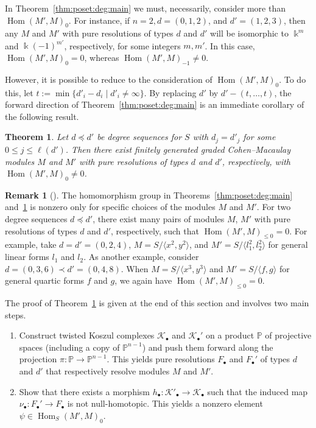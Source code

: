 \documentclass[12pt]{amsart}
\newtheorem{thm}[equation]{Theorem}
\theoremstyle{definition}
\newtheorem{rmk}[equation]{Remark}
\newenvironment{remark}[1][]{\begin{rmk}[#1] \pushQED{\qed}}{\popQED \end{rmk}}
\def\<{\langle}
\def\>{\rangle}
\newcommand{\Hom}{\operatorname{Hom}}
\newcommand{\KK}{\mathcal{K}}
\newcommand{\PP}{\mathbb{P}}
\begin{document}
In Theorem~\ref{thm:poset:deg:main} we must, necessarily, consider more
than $\Hom(M',M)_0$. 
For instance, if $n=2, d=(0,1,2)$, and $d'=(1,2,3)$, then any $M$ and
$M'$ with pure resolutions of types $d$ and $d'$ will be isomorphic to
$\Bbbk^m$ and $\Bbbk(-1)^{m'}$, respectively, for some integers $m,m'$.  
In this case, $\Hom(M',M)_0=0$, whereas $\Hom(M',M)_{-1}\ne 0$.

However, it is possible to reduce to the consideration of $\Hom(M',M)_0$.
To do this, let $t := \min \{d'_i - d_i \mid d'_i\neq \infty \}$. 
By replacing $d'$ by $d' - (t,\dots,t)$, 
the forward direction of Theorem~\ref{thm:poset:deg:main} 
is an immediate corollary of the following result. 

\begin{thm}
\label{thm:deg:after:reduction}
Let $d \preceq d'$ be degree sequences for $S$ with 
$d_j = d'_j$ for some $0 \leq j \leq \ell(d')$. 
Then there exist finitely generated graded Cohen--Macaulay
modules $M$ and $M'$ with pure resolutions of types $d$ and $d'$, respectively,
with $\Hom(M',M)_0\ne 0$.
\end{thm}

\begin{remark}
The homomorphism group in Theorems~\ref{thm:poset:deg:main} 
and~\ref{thm:deg:after:reduction} 
is nonzero only for specific choices of the modules $M$ and $M'$. 
For two degree sequences $d \preceq d'$, there exist many pairs of modules
$M$, $M'$ with pure resolutions of types $d$ and $d'$, respectively,  
such that $\Hom(M',M)_{\leq 0}=0$. 
For example, take $d=d'=(0,2,4)$, 
$M = S/\< x^2,y^2 \>$, and $M' = S/\< l_1^2,l_2^2 \>$ 
for general linear forms $l_1$ and $l_2$. 
As another example, consider $d = (0,3,6) \prec d'= (0,4,8)$.  When $M
= S/\< x^3,y^3 \>$ and $M' = S/\< f,g \>$ for general quartic
forms $f$ and $g$, we again have $\Hom(M',M)_{\leq 0}=0$.
\end{remark}

The proof of Theorem~\ref{thm:deg:after:reduction} is given at the end 
of this section and involves two main steps. 

\begin{enumerate}
\item\label{eq:deg:step:1}
Construct twisted Koszul complexes $\KK_\bullet$ and $\KK_{\bullet}'$ on
a product $\PP$ of projective spaces (including a copy of
$\PP^{n-1}$) and push them forward along the
projection $\pi\colon  \PP\to \PP^{n-1}$.  This yields pure 
resolutions $F_\bullet$ and $F_\bullet'$ of types $d$ and $d'$ that 
respectively resolve modules $M$ and $M'$. 
%
\item\label{eq:deg:step:2}
Show that there exists a morphism $h_\bullet\colon  \KK'_\bullet \to
\KK_\bullet$ such that the induced map $\nu_\bullet \colon  F_\bullet' \to
F_\bullet$ is not null-homotopic. 
This yields a nonzero element $\psi\in \Hom_S(M', M)_0$. 
\end{enumerate}
\end{document}
